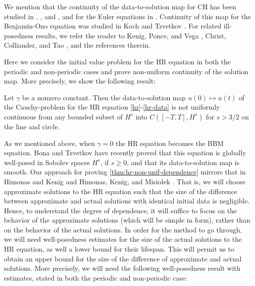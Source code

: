 We mention that the continuity of the data-to-solution map  for CH has 
been studied in  \cite{Himonas_2007_Non-uniform-con},
\cite{Himonas_2001_The-Cauchy-prob}, and 
\cite{Himonas:2005}, and for the Euler equations in 
\cite{Himonas:2010a}. Continuity of this map for  
the Benjamin-Ono equation was studied in Koch and Tzvetkov 
\cite{Koch:2005}. For related ill-posedness results, we 
refer the reader to Kenig, Ponce, and  Vega 
\cite{Kenig_2001_On-the-ill-pose}, Christ, Colliander, and Tao 
\cite{Christ_2003_Asymptotics-fre}, and the references 
therein.

Here we consider the initial value problem for the HR equation
in both the periodic and non-periodic cases
and prove non-uniform  continuity of the solution map. 
More precisely, we show the following result:
%
%
%
%
%
%
\begin{theorem}
\label{thm:hr-non-unif-dependence}
Let $\gamma$ be a nonzero constant. Then 
the data-to-solution map $u(0) \mapsto u(t)$ of the Cauchy-problem
for the HR equation
\eqref{hr}-\eqref{hr-data}
is not uniformly continuous
from any bounded subset of  $H^s$ into $C([-T, T], H^s)$
for $s>3/2$ on the line and circle.
%
\end{theorem}
%
%
%
As we mentioned above, when  $\gamma=0$ the HR equation
becomes the BBM equation.
Bona and Tzvetkov \cite{Bona_2009_Sharp-well-pose} have recently proved  that this equation  
is globally well-posed in  Sobolev spaces $H^s$, if $s \ge 0$,
and that its data-to-solution map is smooth.
%
%
%
Our approach  for proving \cref{thm:hr-non-unif-dependence}  
mirrors  that in Himonas and Kenig \cite{Himonas:2009fk} and 
Himonas, Kenig, and Misio{\l}ek \cite{Himonas:2010}.
That is, we will choose 
approximate solutions to the HR equation such that the size of the difference between approximate and actual solutions with 
identical initial data is negligible. Hence, to understand the degree of 
dependence, it will suffice to focus on the behavior of the approximate 
solutions (which will be simple in form), rather than on the behavior of the 
actual solutions. In order for the method to go through, we will 
need well-posedness estimates for  the size of the 
actual solutions to the HR equation, as well a 
lower bound for their lifespan. This will permit us to obtain an upper 
bound for the size of the difference of approximate and actual solutions. 
More precisely, we will need the following well-posedness result  with estimates,  
stated in both the  periodic and non-periodic case:



